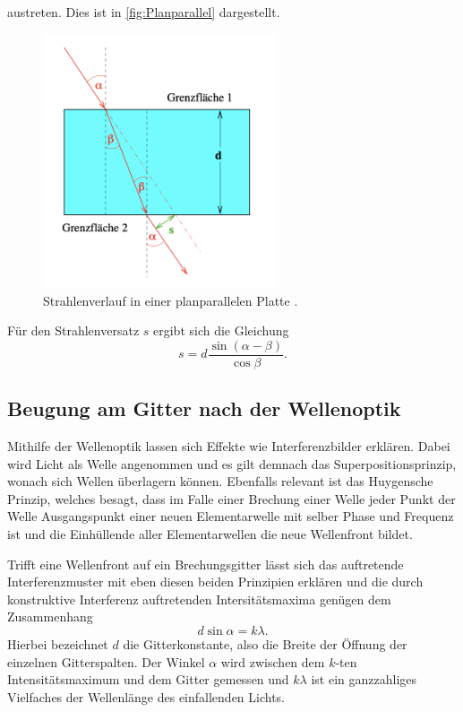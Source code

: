 austreten. Dies ist in \autoref{fig:Planparallel} dargestellt.
\begin{figure}[H]
    \centering
    \includegraphics[height=7.5cm]{content/pics/Planparallel.png}
    \caption{Strahlenverlauf in einer planparallelen Platte \cite{v400}.}
    \label{fig:Planparallel}
\end{figure}
Für den Strahlenversatz $s$ ergibt sich die Gleichung
\begin{equation}
    s = d \frac{\sin(\alpha-\beta)}{\cos\beta}. \label{eq:Strahlenversatz}
\end{equation}

\subsection{Beugung am Gitter nach der Wellenoptik}
Mithilfe der Wellenoptik lassen sich Effekte wie Interferenzbilder erklären. Dabei wird Licht als Welle angenommen und es gilt
demnach das Superpositionsprinzip, wonach sich Wellen überlagern können.
Ebenfalls relevant ist das Huygensche Prinzip, welches besagt, dass im Falle einer Brechung einer Welle jeder Punkt der Welle 
Ausgangspunkt einer neuen Elementarwelle mit selber Phase und Frequenz ist und die Einhüllende aller Elementarwellen die neue 
Wellenfront bildet.

Trifft eine Wellenfront auf ein Brechungsgitter lässt sich das auftretende Interferenzmuster mit eben diesen beiden Prinzipien
erklären und die durch konstruktive Interferenz auftretenden Intersitätsmaxima genügen dem Zusammenhang
\begin{equation}
    d\sin\alpha = k\lambda. \label{eq:Gitter}
\end{equation}
Hierbei bezeichnet $d$ die Gitterkonstante, also die Breite der Öffnung der einzelnen Gitterspalten. Der Winkel $\alpha$ wird
zwischen dem $k$-ten Intensitätsmaximum und dem Gitter gemessen und $k\lambda$ ist ein ganzzahliges Vielfaches der Wellenlänge
des einfallenden Lichts.
